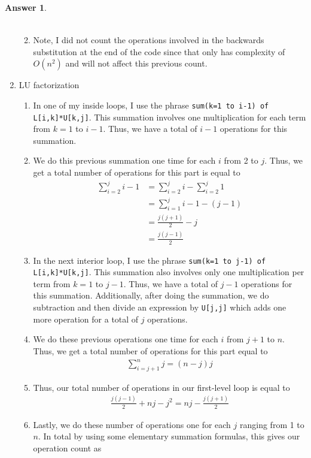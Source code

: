 \documentclass[10pt,a4paper]{article}
\theoremstyle{definition}
\newtheorem*{answer*}{Answer}
\theoremstyle{definition}
\numberwithin{equation}{section}
\begin{document}
\begin{answer*}
\begin{enumerate}[label = $\bullet$]
\begin{enumerate}[label = $\circ$]
\begin{align*}
	\end{align*}
	\item Note, I did not count the operations involved in the backwards substitution at the end of the code since that only has complexity of $O(n^2)$ and will not affect this previous count. 
	\end{enumerate}
\item LU factorization
	\begin{enumerate}[label = $\circ$]
	\item In one of my inside loops, I use the phrase \verb!sum(k=1 to i-1) of L[i,k]*U[k,j]!. This summation involves one multiplication for each term from $k = 1$ to $i - 1$. Thus, we have a total of $i - 1$ operations for this summation. 
	\item We do this previous summation one time for each $i$ from 2 to $j$. Thus, we get a total number of operations for this part is equal to
	\begin{align*}
	\sum_{i = 2}^j i - 1 &= \sum_{i = 2}^j i - \sum_{i = 2}^j 1\\
	&= \sum_{i = 1}^j i - 1 - (j - 1)\\
	&= \frac{j(j + 1)}{2} - j\\
	&= \frac{j(j - 1)}{2}
	\end{align*}
	\item In the next interior loop, I use the phrase \verb!sum(k=1 to j-1) of L[i,k]*U[k,j]!. This summation also involves only one multiplication per term from $k = 1$ to $j - 1$. Thus, we have a total of $j - 1$ operations for this summation. Additionally, after doing the summation, we do subtraction and then divide an expression by \verb!U[j,j]! which adds one more operation for a total of $j$ operations. 
	\item We do these previous operations one time for each $i$ from $j+1$ to $n$. Thus, we get a total number of operations for this part equal to 
	\begin{align*}
	\sum_{i = j+1}^n j = (n - j)j
	\end{align*}
	\item Thus, our total number of operations in our first-level loop is equal to 
	\begin{align*}
	\frac{j(j - 1)}{2} + nj - j^2 = nj - \frac{j(j+1)}{2}
	\end{align*}
	\item Lastly, we do these number of operations one for each $j$ ranging from 1 to $n$. In total by using some elementary summation formulas, this gives our operation count as

\end{enumerate}
\end{enumerate}
\end{answer*}
\end{document}
